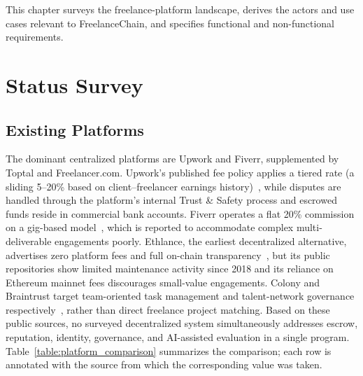 This chapter surveys the freelance-platform landscape, derives the actors and use cases relevant to FreelanceChain, and specifies functional and non-functional requirements.

\section{Status Survey}
\label{section:2.1}

\subsection{Existing Platforms}

The dominant centralized platforms are Upwork and Fiverr, supplemented by Toptal and Freelancer.com. Upwork's published fee policy applies a tiered rate (a sliding 5--20\% based on client--freelancer earnings history)~\cite{upworkfees2024}, while disputes are handled through the platform's internal Trust \& Safety process and escrowed funds reside in commercial bank accounts. Fiverr operates a flat 20\% commission on a gig-based model~\cite{fiverrfees2024}, which is reported to accommodate complex multi-deliverable engagements poorly. Ethlance, the earliest decentralized alternative, advertises zero platform fees and full on-chain transparency~\cite{ethlance2018}, but its public repositories show limited maintenance activity since 2018 and its reliance on Ethereum mainnet fees discourages small-value engagements. Colony and Braintrust target team-oriented task management and talent-network governance respectively~\cite{colony2020whitepaper,braintrust2021whitepaper}, rather than direct freelance project matching. Based on these public sources, no surveyed decentralized system simultaneously addresses escrow, reputation, identity, governance, and AI-assisted evaluation in a single program. Table~\ref{table:platform_comparison} summarizes the comparison; each row is annotated with the source from which the corresponding value was taken.

